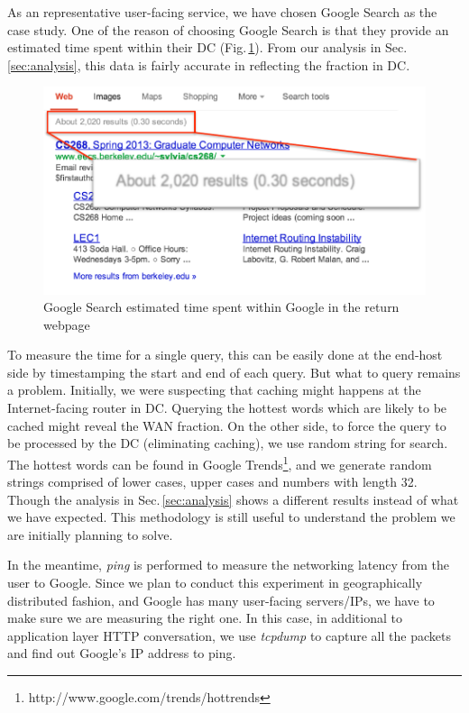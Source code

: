 As an representative user-facing service, we have chosen Google Search as the case study. One of the reason of choosing Google Search is that they provide an estimated time spent within their DC (Fig.\,\ref{fig:google_time}). From our analysis in Sec.\,\ref{sec:analysis}, this data is fairly accurate in reflecting the fraction in DC. 

\begin{figure}
  \centering
  \includegraphics[width=0.85\linewidth]{../figs/GoogleTime.pdf}
  \caption{Google Search estimated time spent within Google in the return webpage}
  \label{fig:google_time}
\end{figure}

To measure the time for a single query, this can be easily done at the end-host side by timestamping the start and end of each query. But what to query remains a problem. Initially, we were suspecting that caching might happens at the Internet-facing router in DC. Querying the hottest words which are likely to be cached might reveal the WAN fraction. On the other side, to force the query to be processed by the DC (eliminating caching), we use random string for search. The hottest words can be found in Google Trends\footnote{http://www.google.com/trends/hottrends}, and we generate random strings comprised of lower cases, upper cases and numbers with length 32. Though the analysis in Sec.\,\ref{sec:analysis} shows a different results instead of what we have expected. This methodology is still useful to understand the problem we are initially planning to solve. 

In the meantime, {\it ping} is performed to measure the networking latency from the user to Google. Since we plan to conduct this experiment in geographically distributed fashion, and Google has many user-facing servers/IPs, we have to make sure we are measuring the right one. In this case, in additional to application layer HTTP conversation, we use {\it tcpdump} to capture all the packets and find out Google's IP address to ping.
 

